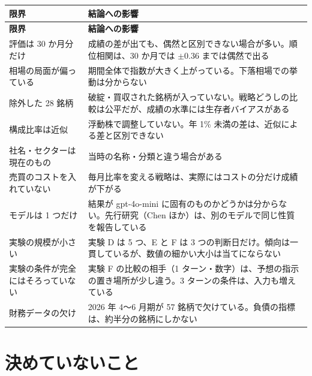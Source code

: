 \documentclass[xelatex,ja=standard,jafont=hiragino-pron,a4paper,10pt]{bxjsreport}
\begin{document}
\begin{longtable}{p{4.20cm}p{10.20cm}}
\toprule
\textbf{限界} & \textbf{結論への影響} \\
\midrule
\endfirsthead
\toprule
\textbf{限界} & \textbf{結論への影響} \\
\midrule
\endhead
\bottomrule
\endfoot
評価は 30 か月分だけ & 成績の差が出ても、偶然と区別できない場合が多い。順位相関は、30 か月では $\pm 0.36$ までは偶然で出る \\
相場の局面が偏っている & 期間全体で指数が大きく上がっている。下落相場での挙動は分からない \\
除外した 28 銘柄 & 破綻・買収された銘柄が入っていない。戦略どうしの比較は公平だが、成績の水準には生存者バイアスがある \\
構成比率は近似 & 浮動株で調整していない。年 1\% 未満の差は、近似による差と区別できない \\
社名・セクターは現在のもの & 当時の名称・分類と違う場合がある \\
売買のコストを入れていない & 毎月比率を変える戦略は、実際にはコストの分だけ成績が下がる \\
モデルは 1 つだけ & 結果が gpt-4o-mini に固有のものかどうかは分からない。先行研究（Chen ほか）は、別のモデルで同じ性質を報告している \\
実験の規模が小さい & 実験 D は 5 つ、E と F は 3 つの判断日だけ。傾向は一貫しているが、数値の細かい大小は当てにならない \\
実験の条件が完全にはそろっていない & 実験 F の比較の相手（1 ターン・数字）は、予想の指示の置き場所が少し違う。3 ターンの条件は、入力も増えている \\
財務データの欠け & 2026 年 4〜6 月期が 57 銘柄で欠けている。負債の指標は、約半分の銘柄にしかない \\
\end{longtable}

\section{決めていないこと}
\end{document}
